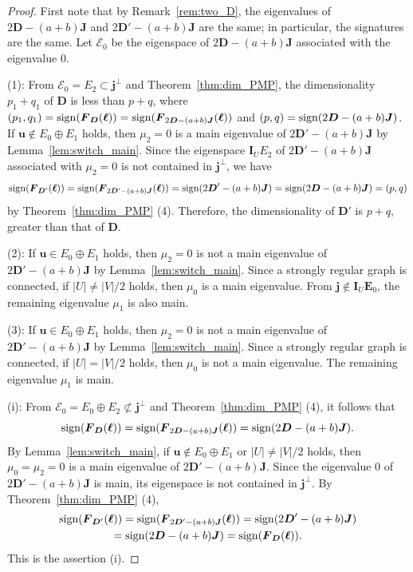 \documentclass[a4paper, 11pt]{article}
\newcommand{\E}{\boldsymbol{E}}
\newcommand{\J}{\boldsymbol{J}}
\newcommand{\I}{\boldsymbol{I}}
\newcommand{\D}{\boldsymbol{D}}
\newcommand{\F}{\boldsymbol{F}}
\newcommand{\jv}{\boldsymbol{j}}
\newcommand{\uv}{\boldsymbol{u}}
\newcommand{\el}{\boldsymbol{\ell}}
\theoremstyle{definition}
\begin{document}
\begin{proof}
First note that by Remark~\ref{rem:two_D},  the 
eigenvalues of $2\D-(a+b)\J$ and $2\D'-(a+b)\J$ are the same; in particular, the signatures are the same. Let $\mathcal{E}_0$ be the eigenspace of $2\D-(a+b) \J$ associated with the eigenvalue 0. 
 
(1): From $\mathcal{E}_0=E_2\subset \jv^{\perp}$ 
and Theorem~\ref{thm:dim_PMP}, 
the dimensionality $p_1+q_1$ of $\D$ is less than $p+q$, where $(p_1,q_1)={\rm sign}(\F_{\D}(\el))={\rm sign}(\F_{2\D-(a+b)\J}(\el))$ and $(p,q)={\rm sign}(2\D-(a+b)\J)$. 
  If $\uv \not\in E_0 \oplus E_1$ holds, then $\mu_2=0$ is a main eigenvalue of $2\D'-(a+b)\J$ by Lemma~\ref{lem:switch_main}. 
 Since the eigenspace $\I_U E_2$ of $2\D'-(a+b)\J$ associated with $\mu_2=0$ is not contained in $\jv^\perp$, we have 
\begin{equation*}
    {\rm sign}(\F_{\D'}(\el))={\rm sign}(\F_{2\D'-(a+b)\J}(\el))={\rm sign}(2\D'-(a+b)\J)={\rm sign}(2\D-(a+b)\J)=(p,q)
\end{equation*}    
by Theorem~\ref{thm:dim_PMP} (4). Therefore, the dimensionality of $\D'$ is $p+q$, greater than that of $\D$. 

(2): If $\uv \in E_0 \oplus E_1$ holds, then $\mu_2=0$ is not a main eigenvalue of $2 \D'-(a+b)\J$ by Lemma~\ref{lem:switch_main}. 
Since a strongly regular graph is connected, if $|U|\ne |V|/2$ holds, 
then $\mu_0$ is a main eigenvalue. 
From $\jv \not\in \I_U \E_0$, the remaining eigenvalue $\mu_1$ is also main. 

(3): If $\uv \in E_0 \oplus E_1$ holds, then $\mu_2=0$ is not a main eigenvalue of $2 \D'-(a+b)\J$ by Lemma~\ref{lem:switch_main}. 
Since a strongly regular graph is connected, if $|U|= |V|/2$ holds, 
then $\mu_0$ is not a main eigenvalue. The remaining eigenvalue $\mu_1$ is main. 

(i): %
From $\mathcal{E}_0=E_0 \oplus E_2 \not\subset \jv^\perp$ and Theorem~\ref{thm:dim_PMP} (4), 
it follows that  \[{\rm sign}(\F_{\D}(\el))={\rm sign}(\F_{2\D-(a+b)\J}(\el))={\rm sign}(2\D-(a+b)\J).\]
 By Lemma~\ref{lem:switch_main}, if $\uv \not\in E_0 \oplus E_1$ or $|U|\ne |V|/2$ holds, then $\mu_0=\mu_2=0$ is a main eigenvalue of $2\D'-(a+b)\J$. 
 Since the eigenvalue $0$ of $2\D'-(a+b)\J$ is main, its eigenspace is not contained in $\jv^{\perp}$. 
By Theorem~\ref{thm:dim_PMP} (4), 
\begin{multline*}
    {\rm sign}(\F_{\D'}(\el)) = {\rm sign}(\F_{2\D'-(a+b)\J}(\el))={\rm sign}(2\D'-(a+b)\J)\\={\rm sign}(2\D-(a+b)\J)={\rm sign}(\F_{\D}(\el)).
\end{multline*}  This is the assertion (i). 


\end{proof}
\end{document}
